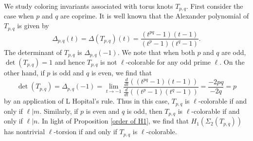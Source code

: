 \documentclass[table]{amsart}
\newcommand{\Z}{\mathbb{Z}}
\newcommand{\Q}{\mathbb{Q}}
\newcommand{\op}[1]{\operatorname{#1}}
\numberwithin{equation}{section}
\begin{document}
\par We study coloring invariants associated with torus knots $T_{p, q}$. First consider the case when $p$ and $q$ are coprime. It is well known that the Alexander polynomial of $T_{p, q}$ is given by 
\[\Delta_{p,q}(t)=\Delta(T_{p, q})(t)=\frac{(t^{pq}-1)(t-1)}{(t^p-1)(t^q-1)}.\]
The determinant of $T_{p, q}$ is $\Delta_{p, q}(-1)$. We note that when both $p$ and $q$ are odd, $\op{det}(T_{p,q})=1$ and hence $T_{p, q}$ is not $\ell$-colorable for any odd prime $\ell$. On the other hand, if $p$ is odd and $q$ is even, we find that 
\[\op{det}(T_{p,q})=\Delta_{p,q}(-1)=\lim_{t\rightarrow -1} \frac{\frac{d}{dt}\left((t^{pq}-1)(t-1)\right)}{\frac{d}{dt}\left((t^p-1)(t^q-1)\right)}=\frac{-2pq}{-2q}=p\] by an application of L Hopital's rule. Thus in this case, $T_{p, q}$ is $\ell$-colorable if and only if $\ell|m$. Similarly, if $p$ is even and $q$ is odd, then $T_{p,q}$ is $\ell$-colorable if and only if $\ell|n$.
In light of Proposition \ref{order of H1}, we find that $H_1(\Sigma_2(T_{p,q}))$ has nontrivial $\ell$-torsion if and only if $T_{p,q}$ is $\ell$-colorable. %

\end{document}
